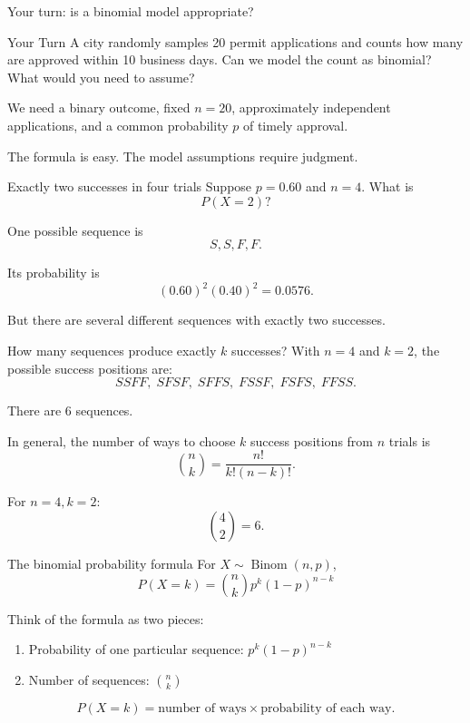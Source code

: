\documentclass[11pt,aspectratio=169]{beamer}
\newcommand{\yourturn}[1]{%
\begin{center}
\begin{minipage}{0.90\textwidth}
\begin{alertblock}{Your Turn}
#1
\end{alertblock}
\end{minipage}
\end{center}}
\begin{document}
\begin{frame}{Your turn: is a binomial model appropriate?}
\yourturn{A city randomly samples 20 permit applications and counts how many are approved within 10 business days. Can we model the count as binomial? What would you need to assume?}

\pause
\vfill
We need a binary outcome, fixed $n=20$, approximately independent applications, and a common probability $p$ of timely approval.

\vspace{0.5em}
The formula is easy. The model assumptions require judgment.
\end{frame}

\begin{frame}{Exactly two successes in four trials}
Suppose $p=0.60$ and $n=4$. What is
\[
P(X=2)?
\]

One possible sequence is
\[
S,S,F,F.
\]

Its probability is
\[
(0.60)^2(0.40)^2=0.0576.
\]

\vfill
But there are several different sequences with exactly two successes.
\end{frame}

\begin{frame}{How many sequences produce exactly $k$ successes?}
With $n=4$ and $k=2$, the possible success positions are:
\[
SSFF,\; SFSF,\; SFFS,\; FSSF,\; FSFS,\; FFSS.
\]

There are 6 sequences.

In general, the number of ways to choose $k$ success positions from $n$ trials is
\[
\boxed{{n\choose k}=\frac{n!}{k!(n-k)!}}.
\]

\vfill
For $n=4,k=2$:
\[
{4\choose 2}=6.
\]
\end{frame}

\begin{frame}{The binomial probability formula}
For $X\sim\operatorname{Binom}(n,p)$,
\[
\boxed{P(X=k)={n\choose k}p^k(1-p)^{n-k}}
\]

Think of the formula as two pieces:

\begin{enumerate}
  \item \alert{Probability of one particular sequence}: $p^k(1-p)^{n-k}$
  \item \alert{Number of sequences}: ${n\choose k}$
\end{enumerate}

\vfill
\[
P(X=k)=\text{number of ways}\times\text{probability of each way}.
\]
\end{frame}
\end{document}
